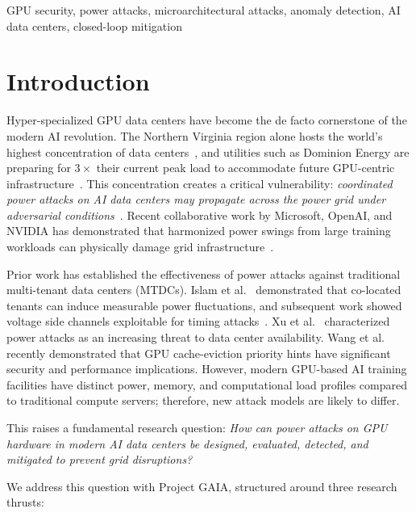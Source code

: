 \documentclass[conference]{IEEEtran}
\begin{document}
\begin{IEEEkeywords}
GPU security, power attacks, microarchitectural attacks, anomaly detection, AI data centers, closed-loop mitigation
\end{IEEEkeywords}

\section{Introduction}
\label{sec:intro}

Hyper-specialized GPU data centers have become the de facto cornerstone
of the modern AI revolution.  The Northern Virginia region alone hosts
the world's highest concentration of data centers~\cite{eia2026}, and
utilities such as Dominion Energy are preparing for $3\times$ their
current peak load to accommodate future GPU-centric
infrastructure~\cite{dominion2026}.  This concentration creates a
critical vulnerability: \emph{coordinated power attacks on AI data
centers may propagate across the power grid under adversarial
conditions}~\cite{choukse2025}.  Recent collaborative work by
Microsoft, OpenAI, and NVIDIA has demonstrated that harmonized power
swings from large training workloads can physically damage grid
infrastructure~\cite{watchus2025,semieng2025}.

Prior work has established the effectiveness of power attacks against
traditional multi-tenant data centers (MTDCs).  Islam et
al.~\cite{islam2017} demonstrated that co-located tenants can induce
measurable power fluctuations, and subsequent work showed voltage side
channels exploitable for timing attacks~\cite{islam2018}.  Xu et
al.~\cite{xu2014} characterized power attacks as an increasing threat
to data center availability.  Wang et al.~\cite{wang2025}
recently demonstrated that GPU cache-eviction priority hints have
significant security and performance implications.  However, modern
GPU-based AI training facilities have distinct power, memory, and
computational load profiles compared to traditional compute servers;
therefore, new attack models are likely to differ.

This raises a fundamental research question: \emph{How can power
attacks on GPU hardware in modern AI data centers be designed,
evaluated, detected, and mitigated to prevent grid disruptions?}

We address this question with Project GAIA, structured around three
research thrusts:
\end{document}

